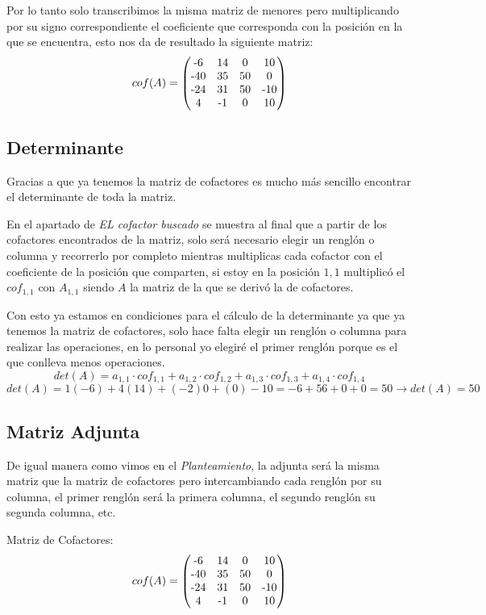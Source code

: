\documentclass{article}
\begin{document}
Por lo tanto solo transcribimos la misma matriz de menores pero multiplicando por su
signo correspondiente el coeficiente que corresponda con la posición en la que se encuentra,
esto nos da de resultado la siguiente matriz:
\begin{equation*}
   cof(A) =
   \begin{pmatrix}
      $-6$ & $14$ & $0$ & $10$ \\
      $-40$ & $35$ & $50$ & $0$\\
      $-24$ & $31$ & $50$ & $-10$\\
      $4$ & $-1$ & $0$ & $10$
   \end{pmatrix}
\end{equation*}


\subsection{Determinante}
Gracias a que ya tenemos la matriz de cofactores es mucho más sencillo encontrar el determinante
de toda la matriz.


En el apartado de \emph{EL cofactor buscado} se muestra al final que a partir de los cofactores
encontrados de la matriz, solo será necesario elegir un renglón o columna y recorrerlo por
completo mientras multiplicas cada cofactor con el coeficiente de la posición que comparten, si
estoy en la posición ${1,1}$ multiplicó el $cof_{1,1}$ con $A_{1,1}$ siendo $A$ la matriz
de la que se derivó la de cofactores.


Con esto ya estamos en condiciones para el cálculo de la determinante ya que ya tenemos
la matriz de cofactores, solo hace falta elegir un renglón o columna para realizar las
operaciones, en lo personal yo elegiré el primer renglón porque es el que conlleva menos
operaciones.
$$det(A) = a_{1,1}\cdot cof_{1,1} + a_{1,2}\cdot cof_{1,2} + a_{1,3}\cdot cof_{1,3}+ a_{1,4}\cdot cof_{1,4}$$
$$det(A) = 1(-6) + 4(14) + (-2)0 + (0)-10 = -6 +56 + 0 + 0 = 50  \rightarrow det(A) = 50$$


\subsection{Matriz Adjunta}
De igual manera como vimos en el \emph{Planteamiento}, la adjunta será la misma matriz
que la matriz de cofactores pero intercambiando cada renglón por su columna, el primer
renglón será la primera columna, el segundo renglón su segunda columna, etc.


Matriz de Cofactores:
\begin{equation*}
   cof(A) =
   \begin{pmatrix}
      $-6$ & $14$ & $0$ & $10$ \\
      $-40$ & $35$ & $50$ & $0$\\
      $-24$ & $31$ & $50$ & $-10$\\
      $4$ & $-1$ & $0$ & $10$
   \end{pmatrix}
\end{equation*}
\end{document}
